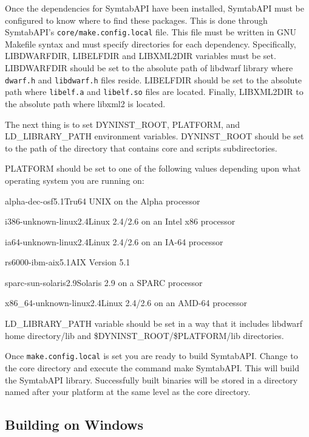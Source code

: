 Once the dependencies for SymtabAPI have been installed, SymtabAPI must be
configured to know where to find these packages. This is done through
SymtabAPI's \texttt{core/make.config.local} file. This file must be written in
GNU Makefile syntax and must specify directories for each dependency.
Specifically, LIBDWARFDIR, LIBELFDIR and LIBXML2DIR variables must be set.
LIBDWARFDIR should be set to the absolute path of libdwarf library where
\texttt{dwarf.h} and \texttt{libdwarf.h} files reside. LIBELFDIR should be set
to the absolute path where \texttt{libelf.a} and \texttt{libelf.so} files are
located. Finally, LIBXML2DIR to the absolute path where libxml2 is located.

The next thing is to set DYNINST\_ROOT, PLATFORM, and LD\_LIBRARY\_PATH
environment variables. DYNINST\_ROOT should be set to the path of the directory
that contains core and scripts subdirectories.

PLATFORM should be set to one of the following values depending upon what operating system you are running on:
\begin{description}
    \item alpha-dec-osf5.1Tru64 UNIX on the Alpha processor
    \item i386-unknown-linux2.4Linux 2.4/2.6 on an Intel x86 processor
    \item ia64-unknown-linux2.4Linux 2.4/2.6 on an IA-64 processor
    \item rs6000-ibm-aix5.1AIX Version 5.1
    \item sparc-sun-solaris2.9Solaris 2.9 on a SPARC processor
    \item x86\_64-unknown-linux2.4Linux 2.4/2.6 on an AMD-64 processor
\end{description}

LD\_LIBRARY\_PATH variable should be set in a way that it includes libdwarf home
directory/lib and \${DYNINST\_ROOT}/\${PLATFORM}/lib directories.

Once \texttt{make.config.local} is set you are ready to build SymtabAPI. Change
to the core directory and execute the command make SymtabAPI. This will build
the SymtabAPI library. Successfully built binaries will be stored in a directory
named after your platform at the same level as the core directory. 

\subsection{Building on Windows}

